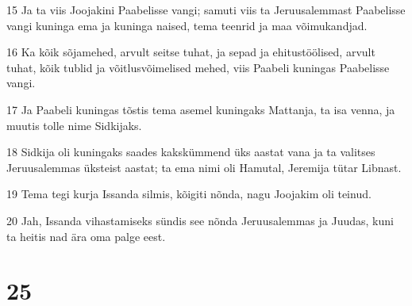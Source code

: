 \par 15 Ja ta viis Joojakini Paabelisse vangi; samuti viis ta Jeruusalemmast Paabelisse vangi kuninga ema ja kuninga naised, tema teenrid ja maa võimukandjad.
\par 16 Ka kõik sõjamehed, arvult seitse tuhat, ja sepad ja ehitustöölised, arvult tuhat, kõik tublid ja võitlusvõimelised mehed, viis Paabeli kuningas Paabelisse vangi.
\par 17 Ja Paabeli kuningas tõstis tema asemel kuningaks Mattanja, ta isa venna, ja muutis tolle nime Sidkijaks.
\par 18 Sidkija oli kuningaks saades kakskümmend üks aastat vana ja ta valitses Jeruusalemmas üksteist aastat; ta ema nimi oli Hamutal, Jeremija tütar Libnast.
\par 19 Tema tegi kurja Issanda silmis, kõigiti nõnda, nagu Joojakim oli teinud.
\par 20 Jah, Issanda vihastamiseks sündis see nõnda Jeruusalemmas ja Juudas, kuni ta heitis nad ära oma palge eest.

\chapter{25}

